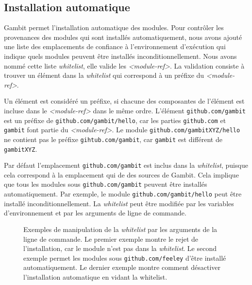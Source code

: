 \subsection{Installation automatique}
Gambit permet l'installation automatique des modules. Pour contrôler les
provenances des modules qui sont installés automatiquement, nous avons
ajouté une liste des emplacements de confiance à l'environnement d'exécution
qui indique quels modules peuvent être installés inconditionnellement.
Nous avons nommé cette liste \textit{whitelist}, elle valide les
\textit{<module-ref>}.  La validation consiste à trouver un
élément dans la \textit{whitelist} qui correspond à un préfixe du
\textit{<module-ref>}.


Un élément est considéré un préfixe, si chacune des composantes de l'élément
est incluse dans le \textit{<module-ref>} dans le même ordre. L'élément
\texttt{github.com/gambit} est un préfixe de \texttt{github.com/gambit/hello},
car les parties \texttt{github.com} et \texttt{gambit} font partie du
\textit{<module-ref>}. Le module \texttt{github.com/gambitXYZ/hello} ne
contient pas le préfixe \texttt{gihtub.com/gambit}, car \texttt{gambit} est
différent de \texttt{gambitXYZ}.

Par défaut l'emplacement \texttt{github.com/gambit} est inclus dans la
\textit{whitelist}, puisque cela correspond à la emplacement qui de des
sources de Gambit.  Cela implique que tous les modules sous
\texttt{github.com/gambit} peuvent être installés automatiquement. Par exemple,
le module \texttt{github.com/gambit/hello} peut être installé
inconditionnellement. La \textit{whitelist} peut être modifiée par
les variables d'environnement et par les arguments de ligne de commande.

\begin{figure}[ht]
  \centering
  \caption{Exemples de manipulation de la {\it whitelist} par
    les arguments de la ligne de commande. Le premier exemple
    montre le rejet de l'installation, car le module n'est pas dans la
    \textit{whitelist}. Le second exemple permet les modules sous
    \texttt{github.com/feeley} d'être installé automatiquement.
    Le dernier exemple montre comment désactiver l'installation automatique
    en vidant la whitelist.}
  \label{fig:whitelist_manipulation}
\end{figure}

